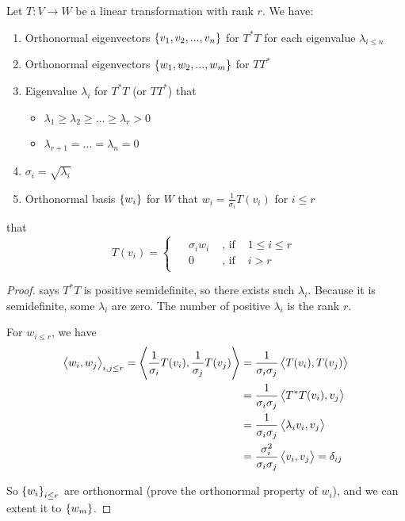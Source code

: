 \begin{theorem}\label{svd_theorem}
    Let $T: V \rightarrow W$ be a linear transformation with rank $r$. We have:
    \begin{enumerate}
        \item Orthonormal eigenvectors $\set{v_1, v_2, ..., v_n}$ for $T^*T$ for each eigenvalue $\lambda_{i\leq n}$
        \item Orthonormal eigenvectors $\set{w_1, w_2, ..., w_m}$ for $TT^*$
        \item Eigenvalue $\lambda_i$ for $T^*T$ (or $TT^*$) that
                \begin{itemize}
                    \item $\lambda_1 \geq \lambda_2 \geq ... \geq \lambda_r > 0$
                    \item $\lambda_{r+1} = ... = \lambda_n = 0$
                \end{itemize}
        \item $\sigma_i = \sqrt{\lambda_i}$
        \item Orthonormal basis $\set{w_i}$ for $W$ that $\displaystyle w_i = \frac{1}{\sigma_i} T(v_i)$ for $i \leq r$
    \end{enumerate} that 
    \begin{equation}
        T(v_i) = \begin{cases}
        \begin{aligned}
            &\sigma_i w_i & \text { , if } & 1 \leq i \leq r \\
            & 0 & \text{ , if } & i > r
        \end{aligned}            
        \end{cases}
    \end{equation}
\end{theorem}
\begin{proof}
     says $T^*T$ is positive semidefinite, so there exists such $\lambda_i$. Because it is semidefinite, some $\lambda_i$ are zero. The number of positive $\lambda_i$ is the rank $r$.
    
    For $w_{i\leq r}$, we have
    \begin{equation}
        \begin{aligned}
            \left\langle \displaystyle w_i, w_j \right\rangle_{i,j \leq r} = \left\langle \displaystyle \frac{1}{\sigma_i} T(v_i), \frac{1}{\sigma_j} T(v_j) \right\rangle &= \frac{1}{\sigma_i \sigma_j} \left\langle \displaystyle T(v_i), T(v_j) \right\rangle \\
             &= \frac{1}{\sigma_i \sigma_j} \left\langle \displaystyle T^*T(v_i), v_j \right\rangle \\
             &= \frac{1}{\sigma_i \sigma_j} \left\langle \displaystyle \lambda_i v_i, v_j \right\rangle \\
             &= \frac{\sigma_i^2}{\sigma_i \sigma_j} \left\langle \displaystyle v_i, v_j \right\rangle = \delta_{ij}
        \end{aligned}        
    \end{equation}
    
    So $\set{w_i}_{i \leq r}$ are orthonormal (prove the orthonormal property of $w_i$), and we can extent it to $\set{w_m}$.
\end{proof}


